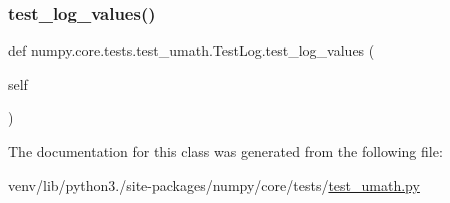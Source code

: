 \subsubsection{\texorpdfstring{test\+\_\+log\+\_\+values()}{test\_log\_values()}}
{\footnotesize\ttfamily def numpy.\+core.\+tests.\+test\+\_\+umath.\+Test\+Log.\+test\+\_\+log\+\_\+values (\begin{DoxyParamCaption}\item[{}]{self }\end{DoxyParamCaption})}



The documentation for this class was generated from the following file\+:\begin{DoxyCompactItemize}
\item 
venv/lib/python3./site-\/packages/numpy/core/tests/\hyperlink{test__umath_8py}{test\+\_\+umath.\+py}\end{DoxyCompactItemize}
